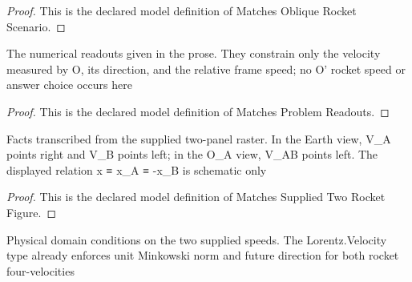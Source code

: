 \begin{proof}
  This is the declared model definition of Matches Oblique Rocket Scenario.
\end{proof}
\begin{definition}
  \label{def:physics:phyx-mini-0565:phyxminiproblems-problemphyxmini0565-matchesproblemreadouts}
  The numerical readouts given in the prose. They constrain only the velocity measured by O, its direction, and the relative frame speed; no O' rocket speed or answer choice occurs here
\end{definition}
\begin{proof}
  This is the declared model definition of Matches Problem Readouts.
\end{proof}
\begin{definition}
  \label{def:physics:phyx-mini-0565:phyxminiproblems-problemphyxmini0565-matchessuppliedtworocketfigure}
  Facts transcribed from the supplied two-panel raster. In the Earth view, V\_A points right and V\_B points left; in the O\_A view, V\_AB points left. The displayed relation x ≡ x\_A ≡ -x\_B is schematic only
\end{definition}
\begin{proof}
  This is the declared model definition of Matches Supplied Two Rocket Figure.
\end{proof}
\begin{definition}
  \label{def:physics:phyx-mini-0565:phyxminiproblems-problemphyxmini0565-hasphysicalinputparameters}
  Physical domain conditions on the two supplied speeds. The Lorentz.Velocity type already enforces unit Minkowski norm and future direction for both rocket four-velocities
\end{definition}
